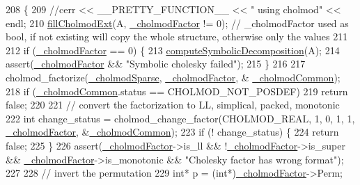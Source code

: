 \begin{DoxyCode}
208     \{
209       \textcolor{comment}{//cerr << \_\_PRETTY\_FUNCTION\_\_ << " using cholmod" << endl;}
210       \hyperlink{classg2o_1_1LinearSolverCholmod_a4b1e18e870b5663f45900dea3bba9155}{fillCholmodExt}(A, \hyperlink{classg2o_1_1LinearSolverCholmod_a674a54287f98130c4aab303508ab945b}{\_cholmodFactor} != 0); \textcolor{comment}{// \_cholmodFactor used as bool,
       if not existing will copy the whole structure, otherwise only the values}
211 
212       \textcolor{keywordflow}{if} (\hyperlink{classg2o_1_1LinearSolverCholmod_a674a54287f98130c4aab303508ab945b}{\_cholmodFactor} == 0) \{
213         \hyperlink{classg2o_1_1LinearSolverCholmod_a40a0f991ae3bb914f2313b55c514640d}{computeSymbolicDecomposition}(A);
214         assert(\hyperlink{classg2o_1_1LinearSolverCholmod_a674a54287f98130c4aab303508ab945b}{\_cholmodFactor} && \textcolor{stringliteral}{"Symbolic cholesky failed"});
215       \}
216 
217       cholmod\_factorize(\hyperlink{classg2o_1_1LinearSolverCholmod_aefbdba58c18dc9eac831eb3d7c24fa18}{\_cholmodSparse}, \hyperlink{classg2o_1_1LinearSolverCholmod_a674a54287f98130c4aab303508ab945b}{\_cholmodFactor}, &
      \hyperlink{classg2o_1_1LinearSolverCholmod_ae7def9c6bf341e0d2f3a3936121fefa1}{\_cholmodCommon});
218       \textcolor{keywordflow}{if} (\hyperlink{classg2o_1_1LinearSolverCholmod_ae7def9c6bf341e0d2f3a3936121fefa1}{\_cholmodCommon}.status == CHOLMOD\_NOT\_POSDEF)
219         \textcolor{keywordflow}{return} \textcolor{keyword}{false};
220 
221       \textcolor{comment}{// convert the factorization to LL, simplical, packed, monotonic}
222       \textcolor{keywordtype}{int} change\_status = cholmod\_change\_factor(CHOLMOD\_REAL, 1, 0, 1, 1, 
      \hyperlink{classg2o_1_1LinearSolverCholmod_a674a54287f98130c4aab303508ab945b}{\_cholmodFactor}, &\hyperlink{classg2o_1_1LinearSolverCholmod_ae7def9c6bf341e0d2f3a3936121fefa1}{\_cholmodCommon});
223       \textcolor{keywordflow}{if} (! change\_status) \{
224         \textcolor{keywordflow}{return} \textcolor{keyword}{false};
225       \}
226       assert(\hyperlink{classg2o_1_1LinearSolverCholmod_a674a54287f98130c4aab303508ab945b}{\_cholmodFactor}->is\_ll && !\hyperlink{classg2o_1_1LinearSolverCholmod_a674a54287f98130c4aab303508ab945b}{\_cholmodFactor}->is\_super && 
      \hyperlink{classg2o_1_1LinearSolverCholmod_a674a54287f98130c4aab303508ab945b}{\_cholmodFactor}->is\_monotonic && \textcolor{stringliteral}{"Cholesky factor has wrong format"});
227 
228       \textcolor{comment}{// invert the permutation}
229       \textcolor{keywordtype}{int}* p = (\textcolor{keywordtype}{int}*)\hyperlink{classg2o_1_1LinearSolverCholmod_a674a54287f98130c4aab303508ab945b}{\_cholmodFactor}->Perm;

\end{DoxyCode}
